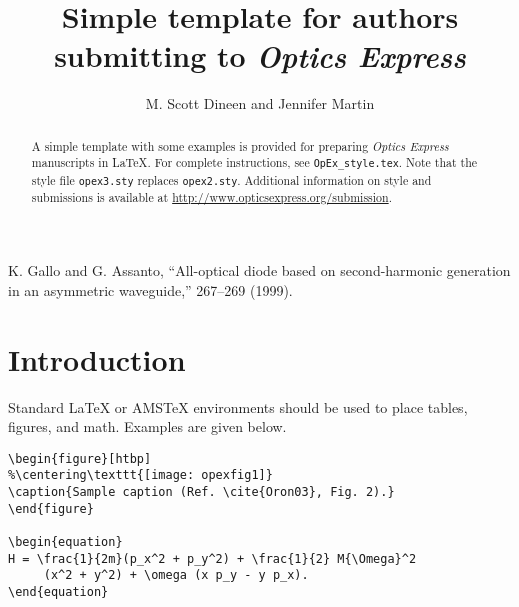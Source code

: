 \documentclass[10pt,letterpaper]{article}
\begin{document}
\title{Simple template for authors submitting to \textit{Optics Express}}

\author{M. Scott Dineen and Jennifer Martin}

\address{Optics Express Office, Publications Department, Optical Society of America, \\ Washington, D.C., 20036}




\begin{abstract}
A simple template with some examples is provided for preparing \textit{Optics Express} manuscripts in \LaTeX. For complete instructions, see \texttt{OpEx\_style.tex}. Note that the style file \texttt{opex3.sty} replaces \texttt{opex2.sty}. Additional information on style and submissions is available at \mbox{\url{http://www.opticsexpress.org/submission}}.
\end{abstract}


\begin{thebibliography}{99}

 K. Gallo and G. Assanto, ``All-optical diode based on second-harmonic generation in an asymmetric waveguide,''  267--269 (1999).

\end{thebibliography}

\section{Introduction}

Standard \LaTeX{} or AMS\TeX{} environments should be used to place tables, figures, and math. Examples are given below.

\begin{verbatim}
\begin{figure}[htbp]
%\centering\texttt{[image: opexfig1]}
\caption{Sample caption (Ref. \cite{Oron03}, Fig. 2).}
\end{figure}

\begin{equation}
H = \frac{1}{2m}(p_x^2 + p_y^2) + \frac{1}{2} M{\Omega}^2
     (x^2 + y^2) + \omega (x p_y - y p_x).
\end{equation}
\end{verbatim}
\end{document}
